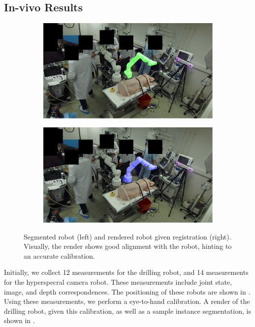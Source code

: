 \subsection{In-vivo Results}
\begin{figure}[tb]
    \centering
    \begin{subfigure}[b]{0.49\textwidth}
        \centering
        \includegraphics[width=\textwidth]{chapter_1/img/left_mask_overlay_0_anonymized.png}
    \end{subfigure}
    \begin{subfigure}[b]{0.49\textwidth}
        \includegraphics[width=\textwidth]{chapter_1/img/left_render_0_anonymized.png}
    \end{subfigure}
    \caption{Segmented robot (left) and rendered robot given registration (right). Visually, the render shows good alignment with the robot, hinting to an accurate calibration.}
    \label{c1:fig:in_vivo_results}
\end{figure}
Initially, we collect 12 measurements for the drilling robot, and 14 measurements for the hyperspecral camera robot. These measurements include joint state, image, and depth correspondences. The positioning of these robots are shown in . Using these measurements, we perform a eye-to-hand calibration. A render of the drilling robot, given this calibration, as well as a sample instance segmentation, is shown in . 

